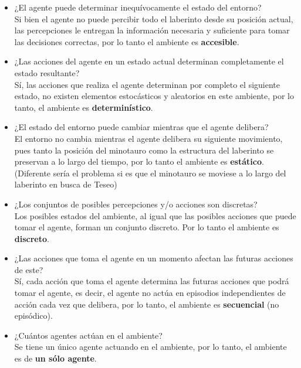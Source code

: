 \documentclass[letter, titlepage, 10pt]{article}
\begin{document}
\begin{itemize}
\item ¿El agente puede determinar inequívocamente el estado del entorno?\\
Si bien el agente no puede percibir todo el laberinto desde su posición actual, las percepciones le entregan la información necesaria y suficiente para tomar las decisiones correctas, por lo tanto el ambiente es \textbf{accesible}.

\item ¿Las acciones del agente en un estado actual determinan completamente el estado resultante?\\
Sí, las acciones que realiza el agente determinan por completo el siguiente estado, no existen elementos estocásticos y aleatorios en este ambiente, por lo tanto, el ambiente es \textbf{determinístico}.

\item ¿El estado del entorno puede cambiar mientras que el agente delibera?\\ El entorno no cambia mientras el agente delibera su siguiente movimiento, pues tanto la posición del minotauro como la estructura del laberinto se preservan a lo largo del tiempo, por lo tanto el ambiente es \textbf{estático}. (Diferente sería el problema si es que el minotauro se moviese a lo largo del laberinto en busca de Teseo)

\item ¿Los conjuntos de posibles percepciones y/o acciones son discretas?\\
Los posibles estados del ambiente, al igual que las posibles acciones que puede tomar el agente, forman un conjunto discreto. Por lo tanto el ambiente es \textbf{discreto}.

\item ¿Las acciones que toma el agente en un momento afectan las futuras acciones de este?\\
Sí, cada acción que toma el agente determina las futuras acciones que podrá tomar el agente, es decir, el agente no actúa en episodios independientes de acción cada vez que delibera, por lo tanto, el ambiente es \textbf{secuencial} (no episódico).

\item ¿Cuántos agentes actúan en el ambiente?\\
Se tiene un único agente actuando en el ambiente, por lo tanto, el ambiente es de \textbf{un sólo agente}.
\end{itemize}
\end{document}
